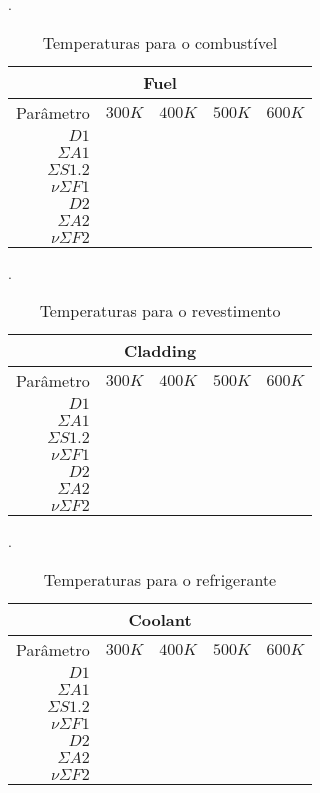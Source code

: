 \begin{table}[htb]
  \caption[Temperaturas para combustível.]{Temperaturas para o combustível}.
  \label{tab-temp-fuel}
  \begin{tabular}{r l l l l}
  \multicolumn{5}{c}{Fuel} \\
  \hline
  Parâmetro & $300K$ & $400K$ & $500K$ & $600K$ \\
  \hline
  $D1$ & & & & \\
  $\Sigma A1$ & & & & \\
  $\Sigma S1.2$ & & & & \\
  $\nu \Sigma F1$ & & & & \\
  \hline
  $D2$ & & & & \\
  $\Sigma A2$ & & & & \\
  $\nu \Sigma F2$ & & & & \\
  \hline
\end{tabular}
\end{table}

\begin{table}[htb]
  \caption[Temperaturas para o revestimento.]{Temperaturas para o revestimento}.
  \label{tab-temp-cladding}
  \begin{tabular}{r l l l l}
    \multicolumn{5}{c}{Cladding} \\
    \hline
    Parâmetro & $300K$ & $400K$ & $500K$ & $600K$ \\
    \hline
    $D1$ & & & & \\
    $\Sigma A1$ & & & & \\
    $\Sigma S1.2$ & & & & \\
    $\nu \Sigma F1$ & & & & \\
    \hline
    $D2$ & & & & \\
    $\Sigma A2$ & & & & \\
    $\nu \Sigma F2$ & & & & \\
    \hline
  \end{tabular}
\end{table}

\begin{table}[htb]
  \caption[Temperaturas para o refrigerante.]{Temperaturas para o refrigerante}.
  \label{tab-temp-coolant}
  \begin{tabular}{r l l l l}
    \multicolumn{5}{c}{Coolant} \\
    \hline
    Parâmetro & $300K$ & $400K$ & $500K$ & $600K$ \\
    \hline
    $D1$ & & & & \\
    $\Sigma A1$ & & & & \\
    $\Sigma S1.2$ & & & & \\
    $\nu \Sigma F1$ & & & & \\
    \hline
    $D2$ & & & & \\
    $\Sigma A2$ & & & & \\
    $\nu \Sigma F2$ & & & & \\
    \hline
  \end{tabular}
\end{table}
